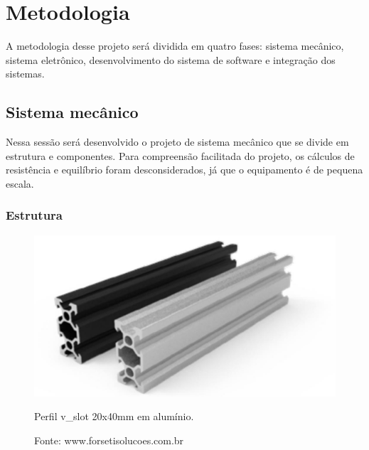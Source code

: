 \chapter{Metodologia}\label{ch:metodologia}

A metodologia desse projeto será dividida em quatro fases: sistema mecânico, sistema eletrônico, 
desenvolvimento do sistema de software e integração dos sistemas.

\section{Sistema mecânico}\label{sec:metmecanico}

Nessa sessão será desenvolvido o projeto de sistema mecânico que se divide em estrutura e componentes. 
Para compreensão facilitada do projeto, os cálculos de resistência e equilíbrio foram desconsiderados, 
já que o equipamento é de pequena escala.

\subsection{Estrutura}\label{subsec:metestrutura}


\begin{figure}[!htb]
\centering
\includegraphics[scale = 0.4]{figuras/3-1}
\caption{Perfil v\_slot  20x40mm em alumínio.}
\caption*{Fonte: www.forsetisolucoes.com.br}
\label{fig:p20x40p}
\end{figure}

